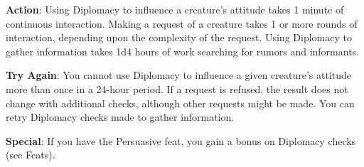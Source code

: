 \textbf{Action}: Using Diplomacy to influence a creature's attitude takes 1 minute of continuous interaction. Making a request of a creature takes 1 or more rounds of interaction, depending upon the complexity of the request. Using Diplomacy to gather information takes 1d4 hours of work searching for rumors and informants.
				
\textbf{Try Again}: You cannot use Diplomacy to influence a given creature's attitude more than once in a 24-hour period. If a request is refused, the result does not change with additional checks, although other requests might be made. You can retry Diplomacy checks made to gather information.
				
\textbf{Special}: If you have the Persuasive feat, you gain a bonus on Diplomacy checks (see Feats).
        	
